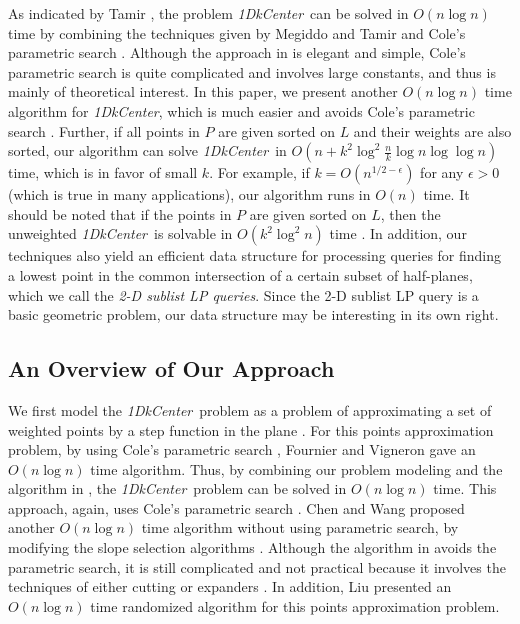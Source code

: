 \documentclass{llncs}
\def\problem{{\it 1DkCenter}}
\begin{document}
As indicated by Tamir \cite{ref:TamirPe14},
 the problem \problem\ can be solved in $O(n\log n)$ time by combining the techniques given by Megiddo and Tamir \cite{ref:MegiddoNe83} and Cole's parametric search  \cite{ref:ColeSl87}.
Although the approach in \cite{ref:MegiddoNe83} is elegant and simple, Cole's parametric search \cite{ref:ColeSl87} is quite complicated and involves large constants, and thus is mainly of theoretical interest.
In this paper, we present another $O(n\log n)$ time algorithm for \problem, which is much easier and avoids Cole's parametric search \cite{ref:ColeSl87}.
Further, if all points in $P$ are given sorted on $L$ and their weights are
also sorted, our algorithm can solve \problem\ in
$O(n+k^2\log^2\frac{n}{k}\log n\log\log n)$ time, which is in favor
of small $k$.
For example, if $k=O(n^{1/2-\epsilon})$ for any $\epsilon>0$ (which is true
in many applications), our algorithm runs in $O(n)$ time.
It should be noted that if the points in $P$ are given sorted on $L$, then the unweighted \problem\ is solvable in $O(k^2\log^2 n)$ time \cite{ref:TamirPe14}.
In addition, our techniques also yield an efficient data structure for
processing queries for finding a lowest point in the common
intersection of a certain subset of half-planes, which we call the
{\em 2-D sublist LP queries}. Since the 2-D sublist LP query is a basic
geometric problem, our data structure may be interesting in its own right.









\subsection{An Overview of Our Approach}

We first model the \problem\ problem as a problem of approximating a set of
weighted points by a step function in the plane \cite{ref:ChenA13,ref:ChenAp13,ref:FournierA13,ref:LiuA10}.
For this points approximation problem, by using Cole's parametric search \cite{ref:ColeSl87}, Fournier and
Vigneron \cite{ref:FournierA13} gave an $O(n\log n)$ time
algorithm. Thus, by combining
our problem modeling and the algorithm in \cite{ref:FournierA13}, the
\problem\ problem can be solved in $O(n\log n)$ time. This approach, again, uses Cole's parametric search \cite{ref:ColeSl87}. Chen and Wang \cite{ref:ChenA13} proposed another $O(n\log n)$ time algorithm without using parametric search, by modifying the slope selection algorithms \cite{ref:BronnimannOp98,ref:KatzOp93}. Although the algorithm in \cite{ref:ChenA13} avoids the parametric search, it is still complicated and not practical because it involves the techniques of either cutting \cite{ref:BronnimannOp98} or expanders \cite{ref:KatzOp93}. In addition, Liu \cite{ref:LiuA10} presented an $O(n\log n)$ time randomized algorithm for this points approximation problem.
\end{document}
